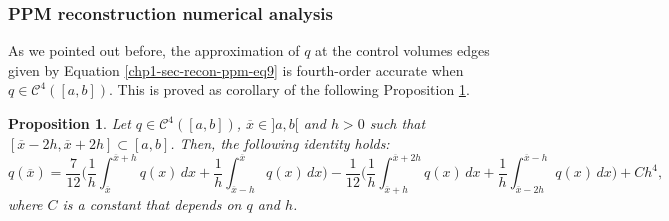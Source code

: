 \theoremstyle{plain}
\newtheorem{lema}{Lemma}[chapter]

\theoremstyle{plain}
\newtheorem{prop}{Proposition}[chapter]

\theoremstyle{plain}
\newtheorem{remark}{Remark}[chapter]

\theoremstyle{plain}
\newtheorem{corollary}{Corollary}[chapter]

\subsubsection{PPM reconstruction numerical analysis}
\label{chp1-sec-numerical-analysis}
As we pointed out before, the approximation of $q$ at the control volumes edges
given by Equation \eqref{chp1-sec-recon-ppm-eq9} is fourth-order accurate when $q \in \mathcal{C}^4([a,b])$. 
This is proved as corollary of the following Proposition \ref{prop:ppm-bound1}.
\begin{prop}
	\label{prop:ppm-bound1}
	Let $q \in \mathcal{C}^{4}([a,b])$, $\overline{x} \in ]a,b[ $ and $h>0$ such that 
	$[\overline{x}-2h,\overline{x}+2h] \subset [a,b]$.
	Then, the following identity holds:
	\begin{equation}
		\label{prop:ppm-bound1-eq1}
		q(\overline{x} ) = \frac{7}{12}\bigg( \frac{1}{h} \int_{\overline{x} }^{\overline{x}+h} q(x) \,dx 
		       + \frac{1}{h} \int_{\overline{x} -h}^{\overline{x} } q(x) \,dx  \bigg)
		       - \frac{1}{12}\bigg( \frac{1}{h} \int_{\overline{x} +h}^{\overline{x}+2h} q(x) \,dx 
		       + \frac{1}{h} \int_{\overline{x} -2h}^{\overline{x} -h} q(x) \,dx  \bigg) + Ch^4,
	\end{equation}
	where $C$ is a constant that depends on $q$ and $h$.
\end{prop}


